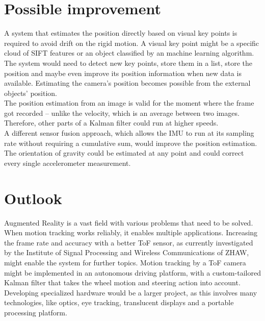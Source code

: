 \section{Possible improvement}
\label{sec:improvement}
A system that estimates the position directly based on visual key points is required to avoid drift on the rigid motion. A visual key point might be a specific cloud of SIFT features or an object classified by an machine learning algorithm.\\
The system would need to detect new key points, store them in a list, store the position and maybe even improve its position information when new data is available. Estimating the camera's position becomes possible from the external objects' position.\\
The position estimation from an image is valid for the moment where the frame got recorded – unlike the velocity, which is an average between two images. Therefore, other parts of a Kalman filter could run at higher speeds.\\
A different sensor fusion approach, which allows the IMU to run at its sampling rate without requiring a cumulative sum, would improve the position estimation. The orientation of gravity could be estimated at any point and could correct every single accelerometer measurement.
 

\section{Outlook}
\label{sec:outlook}
Augmented Reality is a vast field with various problems that need to be solved. When motion tracking works reliably, it enables multiple applications. Increasing the frame rate and accuracy with a better ToF sensor, as currently investigated by the Institute of Signal Processing and Wireless Communications of ZHAW, might enable the system for further topics. Motion tracking by a ToF camera might be implemented in an autonomous driving platform, with a custom-tailored Kalman filter that takes the wheel motion and steering action into account.\\ 
Developing specialized hardware would be a larger project, as this involves many technologies, like optics, eye tracking, translucent displays and a portable processing platform.
